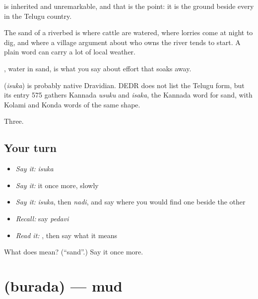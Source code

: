  is inherited and unremarkable, and that is the point: it is the ground beside every  in the Telugu country.

The sand of a riverbed is where cattle are watered, where lorries come at night to dig, and where a village argument about who owns the river tends to start. A plain word can carry a lot of local weather.

 , water in sand, is what you say about effort that soaks away.

\begin{cousinweb}
\textbf{} (\emph{isuka}) is probably native Dravidian. DEDR does not list the Telugu form, but its entry 575 gathers Kannada \emph{usuku} and \emph{isaka}, the Kannada word for sand, with Kolami and Konda words of the same shape.
\end{cousinweb}

\begin{grammarlens}[title={What you've built}]
Three.
\end{grammarlens}

\subsection*{Your turn}
\begin{itemize}
\raggedright
  \item \emph{Say it:} \emph{isuka}
  \item \emph{Say it:} it once more, slowly
  \item \emph{Say it:} \emph{isuka}, then \emph{nadi}, and say where you would find one beside the other
  \item \emph{Recall:} say \emph{pedavi}
  \item \emph{Read it:} \textbf{}, then say what it means
\end{itemize}

\begin{tcolorbox}[breakable,colback=teal!4,colframe=teal!35!black,title={Before you move on}]
What does  mean? (\textquotedblleft{}sand\textquotedblright{}.) Say it once more.
\end{tcolorbox}
\section[\texorpdfstring{\te{బురద} (burada)}{బురద (burada)}]{ (burada) — mud}

\label{lesson:TE-C59-mud}



